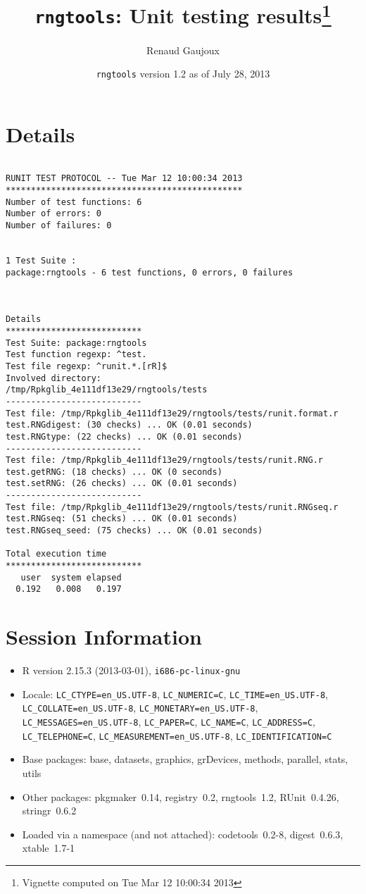 \documentclass[10pt]{article}
\author{Renaud Gaujoux}
\title{\texttt{rngtools}: Unit testing results\footnote{Vignette computed  on Tue Mar 12 10:00:34 2013}}
\date{\texttt{rngtools} version 1.2 as of July 28, 2013}
\begin{document}
\maketitle

\section{Details}
\begin{verbatim}

RUNIT TEST PROTOCOL -- Tue Mar 12 10:00:34 2013 
*********************************************** 
Number of test functions: 6 
Number of errors: 0 
Number of failures: 0 

 
1 Test Suite : 
package:rngtools - 6 test functions, 0 errors, 0 failures



Details 
*************************** 
Test Suite: package:rngtools 
Test function regexp: ^test. 
Test file regexp: ^runit.*.[rR]$ 
Involved directory: 
/tmp/Rpkglib_4e111df13e29/rngtools/tests 
--------------------------- 
Test file: /tmp/Rpkglib_4e111df13e29/rngtools/tests/runit.format.r 
test.RNGdigest: (30 checks) ... OK (0.01 seconds)
test.RNGtype: (22 checks) ... OK (0.01 seconds)
--------------------------- 
Test file: /tmp/Rpkglib_4e111df13e29/rngtools/tests/runit.RNG.r 
test.getRNG: (18 checks) ... OK (0 seconds)
test.setRNG: (26 checks) ... OK (0.01 seconds)
--------------------------- 
Test file: /tmp/Rpkglib_4e111df13e29/rngtools/tests/runit.RNGseq.r 
test.RNGseq: (51 checks) ... OK (0.01 seconds)
test.RNGseq_seed: (75 checks) ... OK (0.01 seconds)

Total execution time
***************************
   user  system elapsed 
  0.192   0.008   0.197 

\end{verbatim}

\section*{Session Information}
\begin{itemize}\raggedright
  \item R version 2.15.3 (2013-03-01), \verb|i686-pc-linux-gnu|
  \item Locale: \verb|LC_CTYPE=en_US.UTF-8|, \verb|LC_NUMERIC=C|, \verb|LC_TIME=en_US.UTF-8|, \verb|LC_COLLATE=en_US.UTF-8|, \verb|LC_MONETARY=en_US.UTF-8|, \verb|LC_MESSAGES=en_US.UTF-8|, \verb|LC_PAPER=C|, \verb|LC_NAME=C|, \verb|LC_ADDRESS=C|, \verb|LC_TELEPHONE=C|, \verb|LC_MEASUREMENT=en_US.UTF-8|, \verb|LC_IDENTIFICATION=C|
  \item Base packages: base, datasets, graphics, grDevices, methods,
    parallel, stats, utils
  \item Other packages: pkgmaker~0.14, registry~0.2, rngtools~1.2,
    RUnit~0.4.26, stringr~0.6.2
  \item Loaded via a namespace (and not attached): codetools~0.2-8,
    digest~0.6.3, xtable~1.7-1
\end{itemize}
\end{document}
